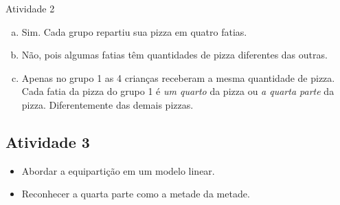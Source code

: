 \begin{multicols}{2}
\begin{resposta*}{Atividade 2}
\begin{enumerate} [a),wide,labelindent=0pt] %
    \item       Sim. Cada grupo repartiu sua pizza em quatro fatias.
    \item       Não, pois algumas fatias têm quantidades de pizza diferentes das outras.
    \item       Apenas no grupo 1 as 4 crianças receberam a mesma quantidade de pizza. Cada fatia da pizza do grupo 1 é {\it um quarto} da pizza ou {\it a quarta parte} da pizza. Diferentemente das demais pizzas.
\end{enumerate} %
\end{resposta*}



\subsection{Atividade 3}
  \vspace{.1cm}

\begin{itemize} %
    \item       Abordar a equipartição em um modelo linear.
    \item       Reconhecer a quarta parte como a metade da metade.
\end{itemize} %
 \vspace{.1cm}

   \vspace{.1cm}


\end{multicols}
